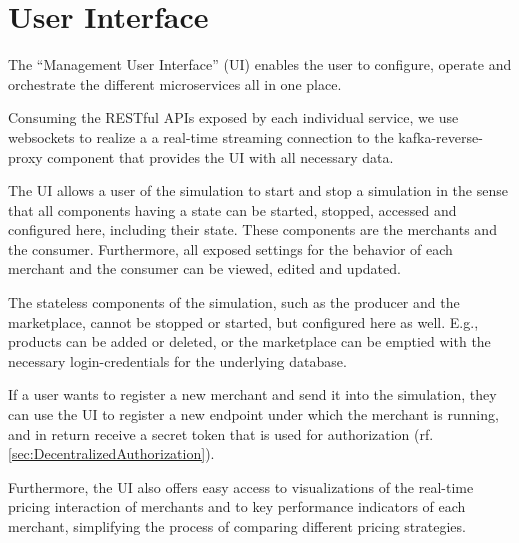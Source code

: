 \section{User Interface}
\label{sec:ui}
%
The ``Management User Interface'' (UI) enables the user to configure, operate and orchestrate the different microservices all in one place. 

Consuming the RESTful APIs exposed by each individual service, we use websockets to realize a a real-time streaming connection to the kafka-reverse-proxy component that provides the UI with all necessary data.



The UI allows a user of the simulation to start and stop a simulation in the sense that all components having a state can be started, stopped, accessed and configured here, including their state. These components are the merchants and the consumer. Furthermore, all exposed settings for the behavior of each merchant and the consumer can be viewed, edited and updated.

The stateless components of the simulation, such as the producer and the marketplace, cannot be stopped or started, but configured here as well. E.g., products can be added or deleted, or the marketplace can be emptied with the necessary login-credentials for the underlying database.

If a user wants to register a new merchant and send it into the simulation, they can use the UI to register a new endpoint under which the merchant is running, and in return receive a secret token that is used for authorization (rf. \cref{sec:DecentralizedAuthorization}). 

Furthermore, the UI also offers easy access to visualizations of the real-time pricing interaction of merchants and to key performance indicators of each merchant, simplifying the process of comparing different pricing strategies.
